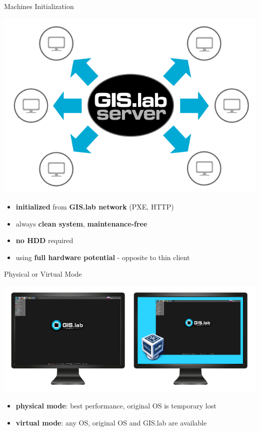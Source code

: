 \documentclass[12pt]{beamer}
\begin{document}
\begin{frame}{Machines Initialization}
	\begin{center}
		\includegraphics[keepaspectratio=true,height=0.4\textheight]{images/gislab-machines-launch.png}
	\end{center}
	\begin{itemize}
		\item \textbf{initialized} from \textbf{GIS.lab network} (PXE, HTTP)
		\item always \textbf{clean system}, \textbf{maintenance-free}
		\item \textbf{no HDD} required
		\item using \textbf{full hardware potential} - opposite to thin client
	\end{itemize}
\end{frame}

\begin{frame}{Physical or Virtual Mode}
	\begin{center}
		\includegraphics[keepaspectratio=true,height=0.5\textheight]{images/physical-or-virtual-mode.png}
	\end{center}
	\begin{itemize}
		\item \textbf{physical mode}: best performance, original OS is temporary lost
		\item \textbf{virtual mode}: any OS, original OS and GIS.lab are available
	\end{itemize}
\end{frame}
\end{document}
